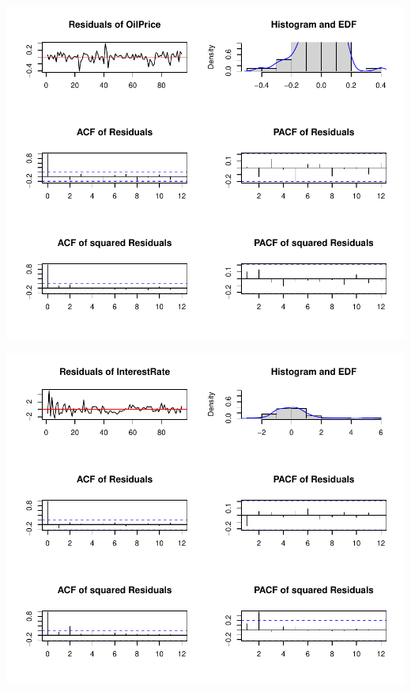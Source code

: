\documentclass[11pt,preprint, authoryear]{elsarticle}
\let\origfigure\figure
\let\endorigfigure\endfigure
\renewenvironment{figure}[1][2] {
    \expandafter\origfigure\expandafter[H]
} {
    \endorigfigure
}
\numberwithin{equation}{section}
\numberwithin{figure}{section}
\numberwithin{table}{section}
\begin{document}
\begin{figure}
\centering
\includegraphics{Time_Series_Proj_Data_files/figure-latex/unnamed-chunk-6-1.pdf}
\caption{Diagnostics plot of VAR(2) for Oil Price\label{figA2}}
\end{figure}

\begin{figure}
\centering
\includegraphics{Time_Series_Proj_Data_files/figure-latex/unnamed-chunk-7-1.pdf}
\caption{Diagnostics plot of VAR(2) for Interest Rate\label{figA3}}
\end{figure}
\end{document}
